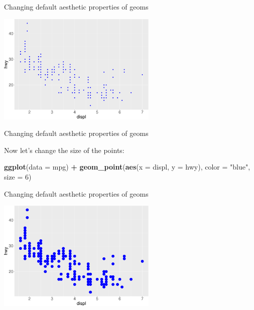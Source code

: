 \documentclass[ignorenonframetext,]{beamer}
\newenvironment{Shaded}{\begin{snugshade}}{\end{snugshade}}
\newcommand{\DataTypeTok}[1]{\textcolor[rgb]{0.13,0.29,0.53}{#1}}
\newcommand{\DecValTok}[1]{\textcolor[rgb]{0.00,0.00,0.81}{#1}}
\newcommand{\KeywordTok}[1]{\textcolor[rgb]{0.13,0.29,0.53}{\textbf{#1}}}
\newcommand{\NormalTok}[1]{#1}
\newcommand{\OperatorTok}[1]{\textcolor[rgb]{0.81,0.36,0.00}{\textbf{#1}}}
\newcommand{\StringTok}[1]{\textcolor[rgb]{0.31,0.60,0.02}{#1}}
\begin{document}
\begin{frame}{Changing default aesthetic properties of geoms}
\protect\hypertarget{changing-default-aesthetic-properties-of-geoms-3}{}

\begin{center}\includegraphics[height=200px]{data-visualization_files/figure-beamer/unnamed-chunk-39-1} \end{center}

\end{frame}

\begin{frame}[fragile]{Changing default aesthetic properties of geoms}
\protect\hypertarget{changing-default-aesthetic-properties-of-geoms-4}{}

Now let's change the size of the points:

\begin{Shaded}
\begin{Highlighting}[]
\KeywordTok{ggplot}\NormalTok{(}\DataTypeTok{data =}\NormalTok{ mpg) }\OperatorTok{+}
\StringTok{  }\KeywordTok{geom_point}\NormalTok{(}\KeywordTok{aes}\NormalTok{(}\DataTypeTok{x =}\NormalTok{ displ, }\DataTypeTok{y =}\NormalTok{ hwy), }
    \DataTypeTok{color =} \StringTok{"blue"}\NormalTok{,}
    \DataTypeTok{size =} \DecValTok{6}\NormalTok{)}
\end{Highlighting}
\end{Shaded}

\end{frame}

\begin{frame}{Changing default aesthetic properties of geoms}
\protect\hypertarget{changing-default-aesthetic-properties-of-geoms-5}{}

\begin{center}\includegraphics[height=200px]{data-visualization_files/figure-beamer/unnamed-chunk-41-1} \end{center}

\end{frame}
\end{document}
